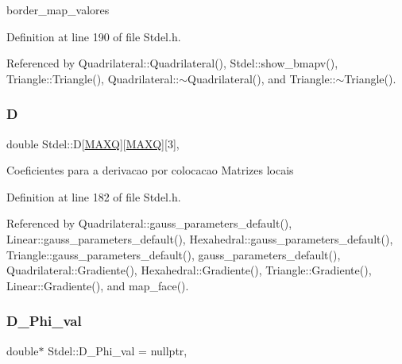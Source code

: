 border\+\_\+map\+\_\+valores 



Definition at line 190 of file Stdel.\+h.



Referenced by Quadrilateral\+::\+Quadrilateral(), Stdel\+::show\+\_\+bmapv(), Triangle\+::\+Triangle(), Quadrilateral\+::$\sim$\+Quadrilateral(), and Triangle\+::$\sim$\+Triangle().

\mbox{\label{classStdel_a61f02fa483b00cb98ff5c8d951068211}} 
\subsubsection{\texorpdfstring{D}{D}}
{\footnotesize\ttfamily double Stdel\+::D\mbox{[}\hyperlink{MyOptions_8h_af708e94d886ba3f59582612949cac702}{M\+A\+XQ}\mbox{]}\mbox{[}\hyperlink{MyOptions_8h_af708e94d886ba3f59582612949cac702}{M\+A\+XQ}\mbox{]}\mbox{[}3\mbox{]}\hspace{0.3cm}{\ttfamily [protected]}, {\ttfamily [inherited]}}

Coeficientes para a derivacao por colocacao Matrizes locais 

Definition at line 182 of file Stdel.\+h.



Referenced by Quadrilateral\+::gauss\+\_\+parameters\+\_\+default(), Linear\+::gauss\+\_\+parameters\+\_\+default(), Hexahedral\+::gauss\+\_\+parameters\+\_\+default(), Triangle\+::gauss\+\_\+parameters\+\_\+default(), gauss\+\_\+parameters\+\_\+default(), Quadrilateral\+::\+Gradiente(), Hexahedral\+::\+Gradiente(), Triangle\+::\+Gradiente(), Linear\+::\+Gradiente(), and map\+\_\+face().

\mbox{\label{classStdel_a80a6c89c61bfef1160257e97b3ffb0a2}} 
\subsubsection{\texorpdfstring{D\+\_\+\+Phi\+\_\+val}{D\_Phi\_val}}
{\footnotesize\ttfamily double$\ast$ Stdel\+::\+D\+\_\+\+Phi\+\_\+val = nullptr\hspace{0.3cm}{\ttfamily [protected]}, {\ttfamily [inherited]}}



